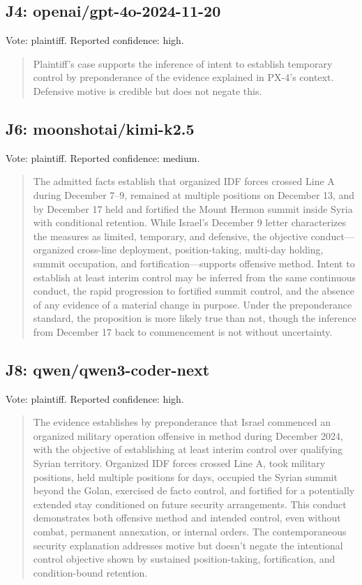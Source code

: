 \subsection{J4: openai/gpt-4o-2024-11-20}

Vote: plaintiff.  Reported confidence: high.

\begin{quote}
Plaintiff's case supports the inference of intent to establish temporary control by preponderance of the evidence explained in PX-4's context. Defensive motive is credible but does not negate this.
\end{quote}

\subsection{J6: moonshotai/kimi-k2.5}

Vote: plaintiff.  Reported confidence: medium.

\begin{quote}
The admitted facts establish that organized IDF forces crossed Line A during December 7–9, remained at multiple positions on December 13, and by December 17 held and fortified the Mount Hermon summit inside Syria with conditional retention. While Israel's December 9 letter characterizes the measures as limited, temporary, and defensive, the objective conduct—organized cross-line deployment, position-taking, multi-day holding, summit occupation, and fortification—supports offensive method. Intent to establish at least interim control may be inferred from the same continuous conduct, the rapid progression to fortified summit control, and the absence of any evidence of a material change in purpose. Under the preponderance standard, the proposition is more likely true than not, though the inference from December 17 back to commencement is not without uncertainty.
\end{quote}

\subsection{J8: qwen/qwen3-coder-next}

Vote: plaintiff.  Reported confidence: high.

\begin{quote}
The evidence establishes by preponderance that Israel commenced an organized military operation offensive in method during December 2024, with the objective of establishing at least interim control over qualifying Syrian territory. Organized IDF forces crossed Line A, took military positions, held multiple positions for days, occupied the Syrian summit beyond the Golan, exercised de facto control, and fortified for a potentially extended stay conditioned on future security arrangements. This conduct demonstrates both offensive method and intended control, even without combat, permanent annexation, or internal orders. The contemporaneous security explanation addresses motive but doesn't negate the intentional control objective shown by sustained position-taking, fortification, and condition-bound retention.
\end{quote}

